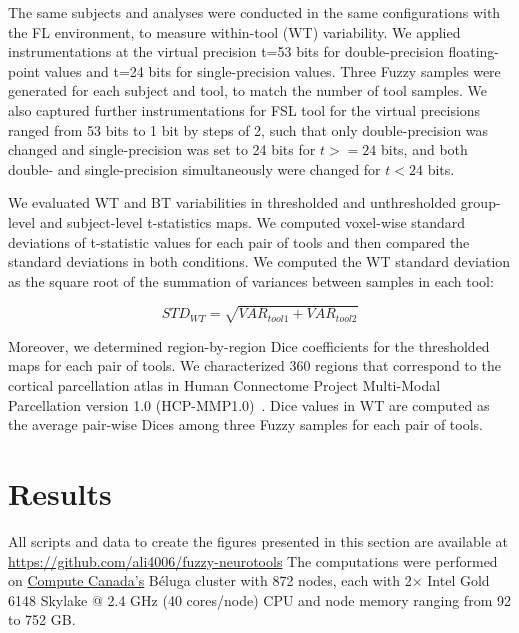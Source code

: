 The same subjects and analyses were conducted in the same configurations
with the FL environment, to measure within-tool (WT) variability. We
applied instrumentations at the virtual precision t=53 bits for
double-precision floating-point values and t=24 bits for single-precision
values. Three Fuzzy samples were generated for each subject and tool, to
match the number of tool samples.
We also captured further instrumentations for FSL tool for the virtual precisions ranged from 53 bits to 1 bit by steps of 2,
such that only double-precision was changed and single-precision was set to 24 bits for $t >= 24$ bits,
and both double- and single-precision simultaneously were changed for $t < 24$ bits.

We evaluated WT and BT variabilities in thresholded and unthresholded group-level and subject-level t-statistics maps.
We computed voxel-wise standard deviations of t-statistic values for each pair of tools
and then compared the standard deviations in both conditions.
We computed the WT standard deviation as the square root of the summation of variances between samples in each tool:

\begin{equation} \label{eq:mca_std}
  STD_{WT} = \sqrt{VAR_{tool1} + VAR_{tool2}}
\end{equation}

Moreover, we determined region-by-region Dice coefficients for the thresholded maps for each pair of tools.
We characterized 360 regions that correspond to the cortical parcellation atlas
in Human Connectome Project Multi-Modal Parcellation version 1.0 (HCP-MMP1.0)~\cite{glasser2016multi}.
Dice values in WT are computed as the average pair-wise Dices among three Fuzzy samples for each pair of tools.

\section{Results}
All scripts and data to create the figures presented in this section are available at \url{https://github.com/ali4006/fuzzy-neurotools} %
The computations were performed on \href{https://www.computecanada.ca}{Compute Canada's} Béluga cluster
with 872 nodes, each with 2× Intel Gold 6148 Skylake @ 2.4 GHz (40 cores/node) CPU and node memory ranging from 92 to 752 GB.

